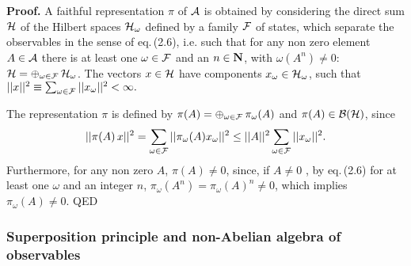 \documentclass[12pt]{article}
\def \Pf {{\bf Proof.\,\,}}
\def \eqq {\equiv}
\def \om {{\omega}}
\def \A {{\cal A}}
\def \B {{\cal B}}
\def \F {{\cal F}}
\def \H {\mbox{${\cal H}$}}
\def \Nbf {{\bf N}}
\begin{document}
\Pf A faithful representation $\pi$ of $\A$ is obtained by considering the direct sum $\H$ of the Hilbert spaces $\ho$ defined by a family $\F$ of states, which separate the observables in the sense of eq.\,(2.6), i.e. such that for any non zero element $A \in \A$ there is at least one $\om \in \F$ and an $n \in \Nbf$, with $\om(A^n) \neq 0$: $\H = \oplus_{\om \in \F}\,\ho$. The vectors $x \in \H$ have components $x_\om \in \ho$, such that $|| x ||^2 \eqq \sum_{\om \in \F} ||x_\om||^2 < \infty.$

\noindent The representation  $\pi$ is defined by $\pi(A) = \oplus_{\om \in \F}\, \po(A)$ and $\pi(A) \in \B(\H)$, since  $$ ||\pi(A)\,x||^2 = \sum_{\om \in \F} || \po(A) x_\om||^2 \leq || A ||^2  \sum_{\om \in \F} || x_\om ||^2. $$ Furthermore, for any non zero $A$, $\pi(A) \neq 0$, since, if $A \neq 0$ , by eq.\,(2.6) for at least one $\om$ and an integer $n$, $\pi_\omega(A^n)= \pi_\omega(A)^n \neq 0$, which implies $\pi_\omega(A) \neq 0$.  QED

\subsubsection{Superposition principle and non-Abelian algebra of observables}


\end{document}
